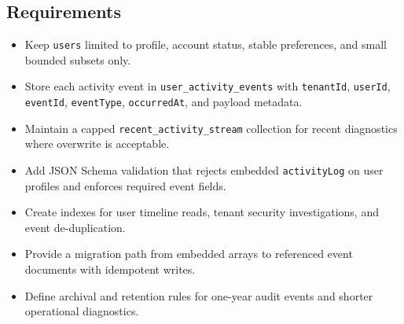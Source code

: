 \subsection*{Requirements}
\begin{itemize}
    \item Keep \texttt{users} limited to profile, account status, stable preferences, and small bounded subsets only.
    \item Store each activity event in \texttt{user\_activity\_events} with \texttt{tenantId}, \texttt{userId}, \texttt{eventId}, \texttt{eventType}, \texttt{occurredAt}, and payload metadata.
    \item Maintain a capped \texttt{recent\_activity\_stream} collection for recent diagnostics where overwrite is acceptable.
    \item Add JSON Schema validation that rejects embedded \texttt{activityLog} on user profiles and enforces required event fields.
    \item Create indexes for user timeline reads, tenant security investigations, and event de-duplication.
    \item Provide a migration path from embedded arrays to referenced event documents with idempotent writes.
    \item Define archival and retention rules for one-year audit events and shorter operational diagnostics.
\end{itemize}

